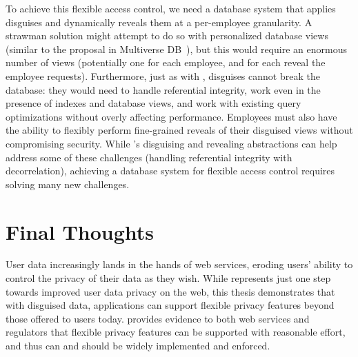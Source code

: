 %
To achieve this flexible access control, we need a database system that applies
disguises and dynamically reveals them at a per-employee granularity.
%
A strawman solution might attempt to do so with personalized database views
(similar to the proposal in Multiverse DB~\cite{multiverse}), but this would
require an enormous number of views (potentially one for each employee, and for
each reveal the employee requests).
%
Furthermore, just as with \sys, disguises cannot break the database: they would
need to handle referential integrity, work even in the presence of indexes and
database views, and work with existing query optimizations without overly
affecting performance.
%
Employees must also have the ability to flexibly perform fine-grained reveals of
their disguised views without compromising security.
%
While \sys's disguising and revealing abstractions can help address some of
these challenges (\eg handling referential integrity with decorrelation),
achieving a database system for flexible access control requires solving many
new challenges.

%
%
%
\section{Final Thoughts}
User data increasingly lands in the hands of web services, eroding users'
ability to control the privacy of their data as they wish.
%
While \sys represents just one step towards improved user data privacy on
the web, this thesis demonstrates that with disguised data,
applications can support flexible privacy features beyond those offered to users
today.
%
\sys provides evidence to both web services and regulators that flexible privacy
features can be supported with reasonable effort, and thus can and should be
widely implemented and enforced.
%
